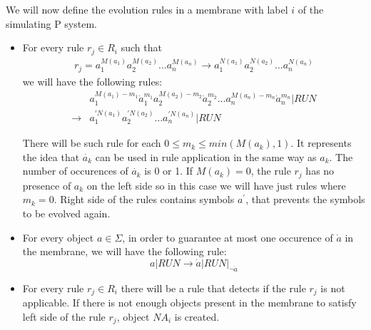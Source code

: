 \begin{dokaz}

  We will now define the evolution rules in a membrane with label $i$ of the simulating P system.

  \begin{itemize}
    \item For every rule $r_j\in R_i$ such that
      \begin{align*}
        r_j = a_1^{M(a_1)}a_2^{M(a_2)}\dots a_n^{M(a_n)} \rightarrow a_1^{N(a_1)}a_2^{N(a_2)}\dots a_n^{N(a_n)}
      \end{align*}
      we will have the following rules:
      \begin{align*}
        &a_1^{M(a_1)-m_1}\dot{a}_1^{m_1}
        a_2^{M(a_2)-m_2}\dot{a}_2^{m_2}\dots
        a_n^{M(a_n)-m_n}\dot{a}_n^{m_n}|\mathit{RUN} \\
        \rightarrow &a_1^{\prime N(a_1)}a_2^{\prime N(a_2)}\dots a_n^{\prime N(a_n)}|\mathit{RUN}
      \end{align*}
      
      There will be such rule for each $0\leq m_k\leq min(M(a_k),1)$. It represents the idea that $\dot{a_k}$ can be used in rule application in the same way as $a_k$. The number of occurences of $\dot{a_k}$ is 0 or 1. If $M(a_k) = 0$, the rule $r_j$ has no presence of $a_k$ on the left side so in this case we will have just rules where $m_k=0$. Right side of the rules contains symbols $a^\prime$, that prevents the symbols to be evolved again.

    \item For every object $a\in\Sigma$, in order to guarantee at most one occurence of $\dot{a}$ in the membrane, we will have the following rule:
    $$a|\mathit{RUN} \rightarrow \dot{a}|\mathit{RUN}|_{\neg \dot{a}}$$

    \item For every rule $r_j\in R_i$ there will be a rule that detects if the rule $r_j$ is not applicable. If there is not enough objects present in the membrane to satisfy left side of the rule $r_j$, object $\mathit{NA_i}$ is created.


\end{itemize}
\end{dokaz}
